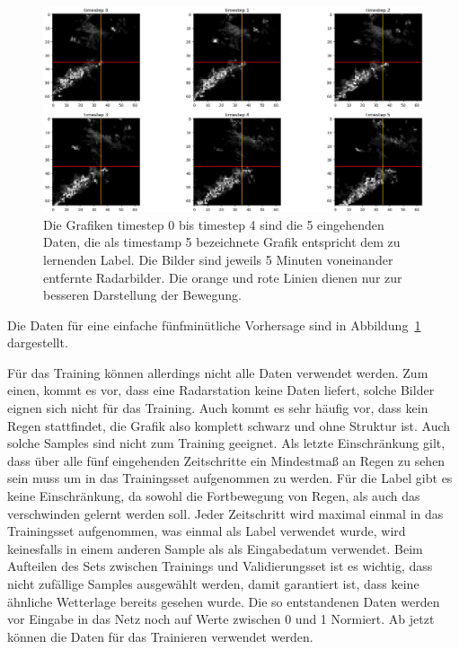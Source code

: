 \begin{figure}[h]
	\includegraphics[width=\linewidth]{pics/5Daten_1Label_Radar.png}
	\caption[Beispielhaftes Trainingssample zur vorhersage von 5 Minuten]{Die Grafiken timestep 0 bis timestep 4 sind die 5 eingehenden Daten, die als timestamp 5 bezeichnete Grafik entspricht dem zu lernenden Label. Die Bilder sind jeweils 5 Minuten voneinander entfernte Radarbilder. Die orange und rote Linien dienen nur zur besseren Darstellung der Bewegung.}
	\label{5D1L}
\end{figure}

Die Daten für eine einfache fünfminütliche Vorhersage sind in Abbildung~\ref{5D1L} dargestellt.

Für das Training können allerdings nicht alle Daten verwendet werden. Zum einen, kommt es vor, dass eine Radarstation keine Daten liefert, solche Bilder eignen sich nicht für das Training. Auch kommt es sehr häufig vor, dass kein Regen stattfindet, die Grafik also komplett schwarz und ohne Struktur ist. Auch solche Samples sind nicht zum Training geeignet. Als letzte Einschränkung gilt, dass über alle fünf eingehenden Zeitschritte ein Mindestmaß an Regen zu sehen sein muss um in das Trainingsset aufgenommen zu werden. Für die Label gibt es keine Einschränkung, da sowohl die Fortbewegung von Regen, als auch das verschwinden gelernt werden soll. Jeder Zeitschritt wird maximal einmal in das Trainingsset aufgenommen, was einmal als Label verwendet wurde, wird keinesfalls in einem anderen Sample als als Eingabedatum verwendet. Beim Aufteilen des Sets zwischen Trainings und Validierungsset ist es wichtig, dass nicht zufällige Samples ausgewählt werden, damit garantiert ist, dass keine ähnliche Wetterlage bereits gesehen wurde.
Die so entstandenen Daten werden vor Eingabe in das Netz noch auf Werte zwischen 0 und 1 Normiert. Ab jetzt können die Daten für das Trainieren verwendet werden.


